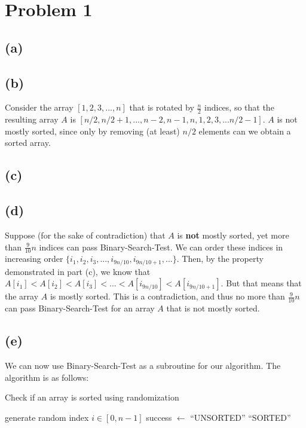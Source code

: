 \documentclass{6046}
\author{Matthew Feng}
\begin{document}
\section*{Problem 1}
\subsection*{(a)}

\subsection*{(b)}
Consider the array $[1, 2, 3, ..., n]$ that is rotated by
$\frac{n}{2}$ indices, so that the resulting array $A$ is
$[n/2, n/2 + 1, ..., n - 2, n - 1, n, 1, 2, 3, ... n/2 - 1]$.
$A$ is not mostly sorted, since only by removing (at least) 
$n/2$ elements can we obtain a sorted array.

\subsection*{(c)}


\subsection*{(d)}
Suppose (for the sake of contradiction) that $A$ is {\bf not}
mostly sorted, yet more than $\frac{9}{10}n$
indices can pass {\sc Binary-Search-Test}. We can order these indices
in increasing order $\{i_1, i_2, i_3, ..., i_{9n/10}, i_{9n/10 + 1}, ...\}$.
Then, by the property demonstrated in part (c), we know that
$A[i_1] < A[i_2] < A[i_3] < ... < A[i_{9n/10}] < A[i_{9n/10 + 1}]$.
But that means that the array $A$ is mostly sorted.
This is a contradiction, and thus no more than $\frac{9}{10}n$ can
pass {\sc Binary-Search-Test} for an array $A$ that is
not mostly sorted.

\subsection*{(e)}
We can now use {\sc Binary-Search-Test} as a subroutine for our
algorithm. The algorithm is as follows:

\begin{algorithm}[H]
  \caption{Check if an array is sorted using randomization}\label{RandCheck}
  \begin{algorithmic}[0]
        \State generate random index $i \in [0, n - 1]$
        \State success $\leftarrow$ 
            \State \Return ``UNSORTED''
        \EndIf
    \EndFor
    \State \Return ``SORTED''
    \EndFunction
  \end{algorithmic}
\end{algorithm}
\end{document}
